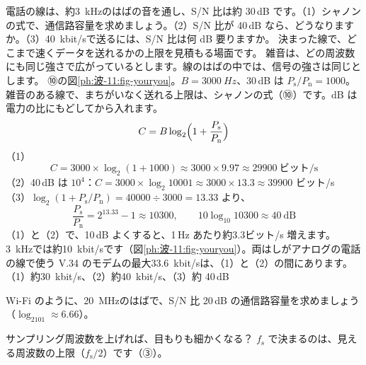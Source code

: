\label{ph:波-11:ex12}
\begin{phreidai}[電話の線で送れる速さ]
電話の線は、約\qty{3}{kHz}のはばの音を通し、S/N 比は約 30\,dB です。（1）シャノンの式で、通信路容量を求めましょう。（2）S/N 比が 40\,dB なら、どうなりますか。（3）\qty{40}{kbit/s}で送るには、S/N 比は何 dB 要りますか。
\phbamen
決まった線で、どこまで速くデータを送れるかの上限を見積もる場面です。
\phmushi
雑音は、どの周波数にも同じ強さで広がっているとします。線のはばの中では、信号の強さは同じとします。
\phzu
⑩の図\ref{ph:波-11:fig-youryou}。$B=\qty{3000}{Hz}$、30\,dB は $P_{\mathrm s}/P_{\mathrm n}=1000$。
\phriyu
雑音のある線で、まちがいなく送れる上限は、シャノンの式（⑩）です。dB は電力の比にもどしてから入れます。
\phtateru
\[C=B\log_2\Bigl(1+\frac{P_{\mathrm s}}{P_{\mathrm n}}\Bigr)\]
\phtoku
（1）\[C=3000\times\log_2(1+1000)\approx3000\times9.97\approx\num{29900}\ \text{ビット/s}\]
（2）40\,dB は $10^4$：$C=3000\times\log_2\num{10001}\approx3000\times13.3\approx\num{39900}$ ビット/s\\
（3）$\log_2(1+P_{\mathrm s}/P_{\mathrm n})=40000\div3000=13.33$ より、\[\frac{P_{\mathrm s}}{P_{\mathrm n}}=2^{13.33}-1\approx\num{10300},\qquad10\log_{10}10300\approx40\ \text{dB}\]
\phtashikame
（1）と（2）で、10\,dB よくすると、1\,Hz あたり約3.3ビット/s 増えます。\qty{3}{kHz}では約\qty{10}{kbit/s}です（図\ref{ph:波-11:fig-youryou}）。両はしがアナログの電話の線で使う V.34 のモデムの最大\qty{33.6}{kbit/s}は、（1）と（2）の間にあります。
\kotae （1）約\qty{30}{kbit/s}、（2）約\qty{40}{kbit/s}、（3）約 40\,dB
\end{phreidai}
\begin{jibun}
Wi-Fi のように、\qty{20}{MHz}のはばで、S/N 比 20\,dB の通信路容量を求めましょう（$\log_2101\approx6.66$）。
\end{jibun}

\begin{tsumazuki}{サンプリング周波数を上げれば、目もりも細かくなる？}
$f_{\mathrm s}$ で決まるのは、見える周波数の上限（$f_{\mathrm s}/2$）です（③）。
\end{tsumazuki}

